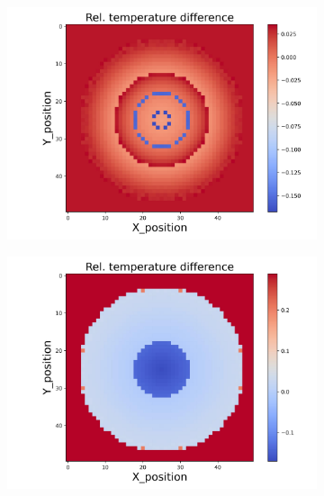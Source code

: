 \begin{figure}[h]
    \begin{minipage}{\textwidth}
        \centering
        \begin{subfigure}{0.325\textwidth}
            \centering
            \includegraphics[width=\textwidth]{figures/raw_data/25/linear/T_bias.jpg}
        \end{subfigure}
        \begin{subfigure}{0.325\textwidth}
            \centering
            \includegraphics[width=\textwidth]{figures/raw_data/26/linear/T_bias.jpg}
        \end{subfigure}
        \begin{subfigure}{0.325\textwidth}

\end{subfigure}
\end{minipage}
\end{figure}
